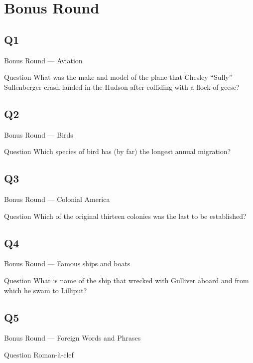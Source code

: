 \documentclass[11pt]{beamer}
\begin{document}
\section{Bonus Round}
\subsection*{Q1}
\begin{frame}[t]{Bonus Round --- Aviation}
\vspace{-0.5em}
\begin{block}{Question}
What was the make and model of the plane that Chesley ``Sully'' Sullenberger crash landed in the Hudson after colliding with a flock of geese?
\end{block}
\end{frame}
\subsection*{Q2}
\begin{frame}[t]{Bonus Round --- Birds}
\vspace{-0.5em}
\begin{block}{Question}
Which species of bird has (by far) the longest annual migration?
\end{block}
\end{frame}
\subsection*{Q3}
\begin{frame}[t]{Bonus Round --- Colonial America}
\vspace{-0.5em}
\begin{block}{Question}
Which of the original thirteen colonies was the last to be established?
\end{block}
\end{frame}
\subsection*{Q4}
\begin{frame}[t]{Bonus Round --- Famous ships and boats}
\vspace{-0.5em}
\begin{block}{Question}
What is name of the ship that wrecked with Gulliver aboard and from which he swam to Lilliput?
\end{block}
\end{frame}
\subsection*{Q5}
\begin{frame}[t]{Bonus Round --- Foreign Words and Phrases}
\vspace{-0.5em}
\begin{block}{Question}
Roman-à-clef
\end{block}
\end{frame}
\end{document}
